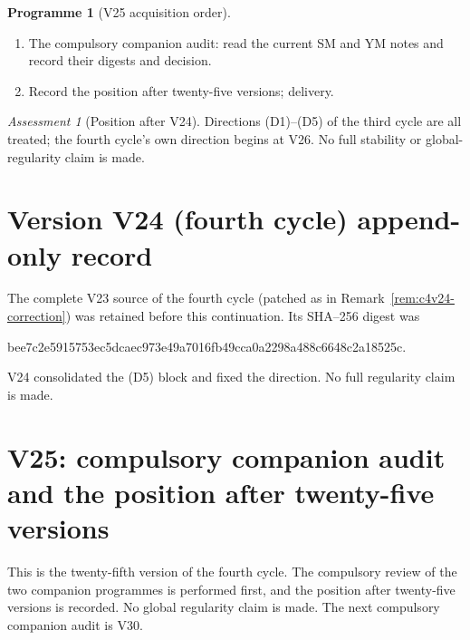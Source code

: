 \documentclass[11pt]{article}
\theoremstyle{plain}
\theoremstyle{definition}
\newtheorem{programme}[theorem]{Programme}
\theoremstyle{remark}
\newtheorem{assessment}[theorem]{Assessment}
\begin{document}
\begin{programme}[V25 acquisition order]
\label{prog:c4v25}
\begin{enumerate}[label=\textup{(AC\arabic*)},leftmargin=4.8em]
\item The compulsory companion audit: read the current SM and YM
      notes and record their digests and decision.
\item Record the position after twenty-five versions; delivery.
\end{enumerate}
\end{programme}

\begin{assessment}[Position after V24]
\label{ass:c4v24-position}
Directions (D1)--(D5) of the third cycle are all treated; the fourth
cycle's own direction begins at V26.  No full stability or
global-regularity claim is made.
\end{assessment}

\section*{Version V24 (fourth cycle) append-only record}

The complete V23 source of the fourth cycle (patched as in
Remark~\ref{rem:c4v24-correction}) was retained before this
continuation.  Its SHA--256 digest was
\begin{center}\scriptsize\ttfamily
bee7c2e5915753ec5dcaec973e49a7016fb49cca0a2298a488c6648c2a18525c.
\end{center}
V24 consolidated the (D5) block and fixed the direction.  No full
regularity claim is made.

\section{V25: compulsory companion audit and the position after twenty-five versions}
\label{sec:c4v25-entry}

This is the twenty-fifth version of the fourth cycle.  The compulsory
review of the two companion programmes is performed first, and the
position after twenty-five versions is recorded.  No global
regularity claim is made.  The next compulsory companion audit is
V30.
\end{document}
